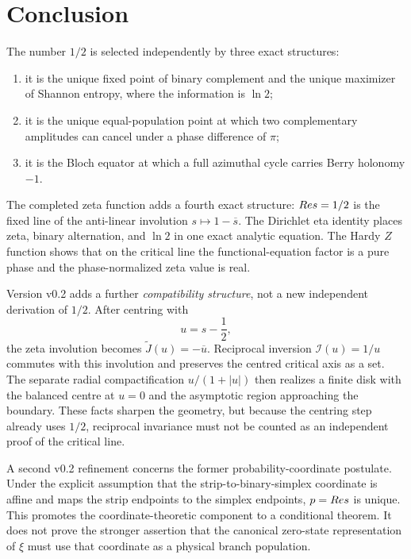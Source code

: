 \chapter{Conclusion}
\label{ch:conclusion}

The number $1/2$ is selected independently by three exact structures:
\begin{enumerate}
\item it is the unique fixed point of binary complement and the unique maximizer of Shannon entropy, where the information is $\ln2$;
\item it is the unique equal-population point at which two complementary amplitudes can cancel under a phase difference of $\pi$;
\item it is the Bloch equator at which a full azimuthal cycle carries Berry holonomy $-1$.
\end{enumerate}
The completed zeta function adds a fourth exact structure: $Re s=1/2$ is the fixed line of the anti-linear involution $s\mapsto1-\overline s$. The Dirichlet eta identity places zeta, binary alternation, and $\ln2$ in one exact analytic equation. The Hardy $Z$ function shows that on the critical line the functional-equation factor is a pure phase and the phase-normalized zeta value is real.

Version v0.2 adds a further \emph{compatibility structure}, not a new independent derivation of $1/2$. After centring with
\begin{equation}
u=s-\frac12,
\end{equation}
the zeta involution becomes $\widetilde J(u)=-\overline u$. Reciprocal inversion $\mathcal I(u)=1/u$ commutes with this involution and preserves the centred critical axis as a set. The separate radial compactification $u/(1+|u|)$ then realizes a finite disk with the balanced centre at $u=0$ and the asymptotic region approaching the boundary. These facts sharpen the geometry, but because the centring step already uses $1/2$, reciprocal invariance must not be counted as an independent proof of the critical line.

A second v0.2 refinement concerns the former probability-coordinate postulate. Under the explicit assumption that the strip-to-binary-simplex coordinate is affine and maps the strip endpoints to the simplex endpoints, $p=Re s$ is unique. This promotes the coordinate-theoretic component to a conditional theorem. It does not prove the stronger assertion that the canonical zero-state representation of $\xi$ must use that coordinate as a physical branch population.


